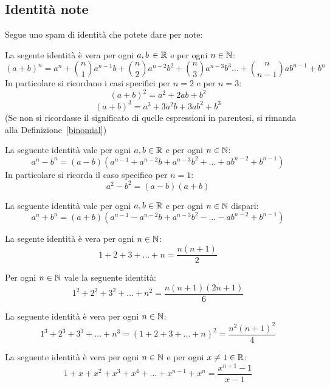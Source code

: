 \documentclass[11pt]{scrartcl}
\begin{document}
	
	\subsection{Identità note}
	Segue uno spam di identità che potete dare per note:
	
	\begin{theorem}
		\label{ident:newton}
		La segente identità è vera per ogni $a,b\,\in\mathbb R$ e per ogni $n\in\mathbb N$:
		$$(a+b)^n=a^n+\binom{n}{1}a^{n-1}b+\binom{n}{2}a^{n-2}b^2+\binom{n}{3}a^{n-3}b^3\dots+\binom{n}{n-1}ab^{n-1}+b^n$$
		In particolare si ricordano i casi specifici per $n=2$ e per $n=3$:
		$$(a+b)^2=a^2+2ab+b^2$$
		$$(a+b)^3=a^3+3a^2b+3ab^2+b^3$$
		(Se non si ricordasse il significato di quelle espressioni in parentesi, si rimanda alla Definizione~\ref{binomial})
	\end{theorem}
	\begin{theorem}
		La seguente identità vale per ogni $a,b \in \mathbb R$ e per ogni $n \in \mathbb N$:
		$$a^n-b^n=(a-b)(a^{n-1}+a^{n-2}b+a^{n-3}b^2+\dots+ab^{n-2}+b^{n-1})$$
		In particolare si ricorda il caso specifico per $n=1$:
		$$a^2-b^2=(a-b)(a+b)$$
	\end{theorem}
	\begin{theorem}
		La seguente identità vale per ogni $a,b \in \mathbb R$ e per ogni $n \in \mathbb N$ dispari:
		$$a^n+b^n=(a+b)(a^{n-1}-a^{n-2}b+a^{n-3}b^2-\dots-ab^{n-2}+b^{n-1})$$
	\end{theorem}
	\begin{theorem}[Gauss]
		\label{sum:1}
		La segente identità è vera per ogni $n \in \mathbb N$:
		$$1+2+3+\dots+n=\frac{n(n+1)}{2}$$
	\end{theorem}
	\begin{theorem}
		\label{sum:2}
		Per ogni $n\in\mathbb N$ vale la seguente identità:
		$$1^2+2^2+3^2+\dots+n^2=\frac{n(n+1)(2n+1)}{6}$$
	\end{theorem}
	\begin{theorem}[Nicomaco]
		\label{sum:3}
		La seguente identità è vera per ogni $n \in \mathbb N$:
		$$1^3+2^3+3^3+\dots+n^3=(1+2+3+\dots+n)^2=\frac{n^2(n+1)^2}{4}$$
	\end{theorem}
	\begin{theorem}
		\label{sum:g}
		La seguente identità è vera per ogni $n \in \mathbb N$ e per ogni $x\ne 1 \in \mathbb R$:
		$$1+x+x^2+x^3+x^4+\dots+x^{n-1}+x^n=\frac{x^{n+1}-1}{x-1}$$
	\end{theorem}
\end{document}
